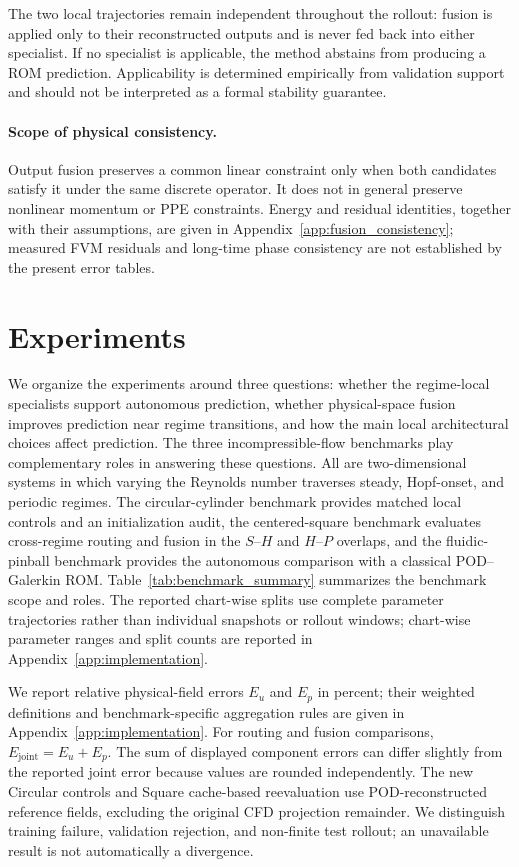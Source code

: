 \documentclass{article}
\begin{document}
The two local trajectories remain independent throughout the rollout: fusion is applied only to their reconstructed outputs and is never fed back into either specialist. If no specialist is applicable, the method abstains from producing a ROM prediction. Applicability is determined empirically from validation support and should not be interpreted as a formal stability guarantee.


\paragraph{Scope of physical consistency.}
Output fusion preserves a common linear constraint only when both
candidates satisfy it under the same discrete operator. It does not in
general preserve nonlinear momentum or PPE constraints. Energy and
residual identities, together with their assumptions, are given in
Appendix~\ref{app:fusion_consistency}; measured FVM residuals and long-time
phase consistency are not established by the present error tables.

\section{Experiments}
\label{sec:experiments}

We organize the experiments around three questions: whether the regime-local specialists support autonomous prediction, whether
physical-space fusion improves prediction near regime transitions, and how the main local architectural choices affect prediction.
The three incompressible-flow benchmarks play complementary roles in answering these questions. All are two-dimensional systems in which varying the Reynolds number traverses steady, Hopf-onset, and periodic regimes. The circular-cylinder benchmark provides matched local controls and an initialization audit, the centered-square benchmark evaluates cross-regime routing and fusion in the $S$--$H$ and $H$--$P$ overlaps, and the fluidic-pinball benchmark provides the autonomous comparison with a classical POD--Galerkin ROM. Table~\ref{tab:benchmark_summary} summarizes the benchmark scope and roles. The reported chart-wise splits use complete parameter trajectories rather than individual snapshots or rollout windows; chart-wise parameter ranges and split counts are reported in Appendix~\ref{app:implementation}.

We report relative physical-field errors $E_u$ and $E_p$ in percent; their weighted definitions and benchmark-specific aggregation rules are given in Appendix~\ref{app:implementation}. For routing and fusion comparisons, $E_{\mathrm{joint}}=E_u+E_p$. The sum of displayed component errors can differ slightly from the reported joint error because values are rounded independently. The new Circular controls and Square cache-based reevaluation use
POD-reconstructed reference fields, excluding the original CFD projection
remainder. We distinguish training failure, validation rejection, and
non-finite test rollout; an unavailable result is not automatically a
divergence. 
\end{document}
